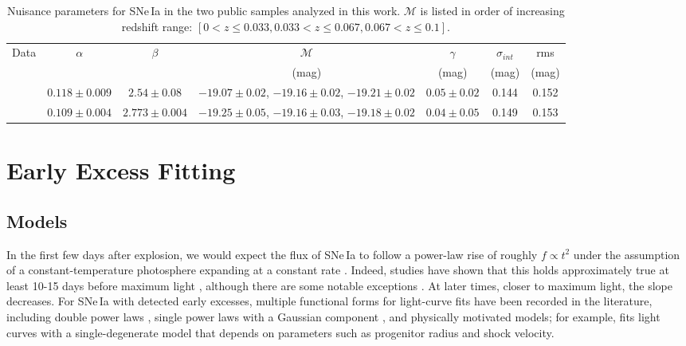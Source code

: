 \documentclass[twocolumn,twocolappendix, linenumbers]{aastex631} %
\begin{document}
\begin{table}[ht]
\centering
\begin{tabular}{ |c|c|c|c|c|c|c|} 
 \hline
 Data & $\alpha$ & $\beta$ & $\mathcal{M}$& $\gamma$ & $\sigma_{int}$ & rms \\
&&& (mag)& (mag)& (mag)& (mag)\\
 \hline
 \citet{Dhawan22} & $0.118 \pm 0.009$ & $2.54 \pm 0.08$ & $-19.07 \pm 0.02$, $-19.16 \pm 0.02$, $-19.21 \pm 0.02$ & $0.05 \pm 0.02$ & 0.144 & 0.152 \\
 \citet{Yao19} & $0.109 \pm 0.004$ & $2.773 \pm 0.004$ & $-19.25 \pm 0.05$, $-19.16 \pm 0.03$, $-19.18 \pm 0.02$ & $0.04 \pm 0.05$ & 0.149 & 0.153\\
 \hline
\end{tabular}
\caption{Nuisance parameters for SNe\,Ia in the two public samples analyzed in this work.  $\mathcal{M}$ is listed in order of increasing redshift range: $[0 < z \leq 0.033, 0.033 < z \leq 0.067, 0.067 < z \leq 0.1]$.}
\label{table:tripp}
\end{table}

\section{Early Excess Fitting} \label{fitting}
\subsection{Models}
In the first few days after explosion, we would expect the flux of SNe\,Ia to follow a power-law rise of roughly $f \propto t^2$ under the assumption of a constant-temperature photosphere expanding at a constant rate \citep[the so-called expanding fireball model;][]{Riess99}. Indeed, studies have shown that this holds approximately true at least 10-15 days before maximum light \citep{Miller20}, although there are some notable exceptions \citep[e.g.,][]{Shappee16,Fausnaugh23, Hoogendam23}. At later times, closer to maximum light, the slope decreases. For SNe\,Ia with detected early excesses, multiple functional forms for light-curve fits have been recorded in the literature, including double power laws \citep[e.g.,][]{Shappee19}, single power laws with a Gaussian component \citep[e.g.,][]{Dimitriadis19}, and physically motivated models; for example, \citet{Hosseinzadeh23} fits light curves with a single-degenerate model that depends on parameters such as progenitor radius and shock velocity. 
\end{document}
